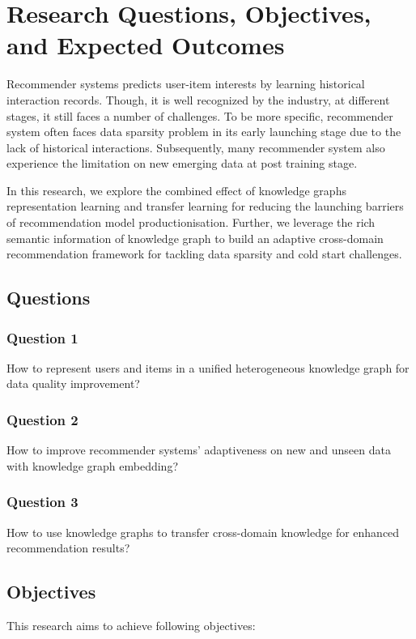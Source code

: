 
\section{Research Questions, Objectives, and Expected Outcomes}

Recommender systems predicts user-item interests by learning historical interaction records. Though, it is well recognized by the industry, at different stages, it still faces a number of challenges. 
To be more specific, recommender system often faces data sparsity problem in its early launching stage due to the lack of historical interactions. 
Subsequently, many recommender system also experience the limitation on new emerging data at post training stage.

In this research, we explore the combined effect of knowledge graphs representation learning and transfer learning for reducing the launching barriers of recommendation model productionisation. Further, we leverage the rich semantic information of knowledge graph to build an adaptive cross-domain recommendation framework for tackling data sparsity and cold start challenges. 

\subsection{Questions}

\subsubsection*{Question 1}
How to represent users and items in a unified heterogeneous knowledge graph for data quality improvement?

\subsubsection*{Question 2}
How to improve recommender systems' adaptiveness on new and unseen data with knowledge graph embedding?

\subsubsection*{Question 3}
How to use knowledge graphs to transfer cross-domain knowledge for enhanced recommendation results?

\subsection{Objectives}
This research aims to achieve following objectives: 

